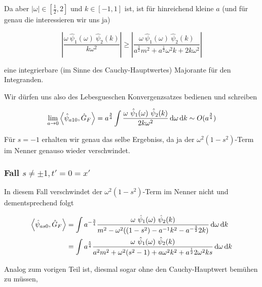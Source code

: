\documentclass{scrartcl}
\begin{document}
Da aber $|\omega| \in [\frac{1}{2},2]$ und $k \in [-1,1]$ ist, ist für hinreichend
kleine $a$ (und für genau die interessieren wir uns ja)

\begin{equation*}
    \left|
        \frac{\omega ~\hat \psi_1(\omega) ~\hat \psi_2(k)}{k \omega^2}
    \right|
    \geq
    \left|
        \frac{\omega ~\hat \psi_1(\omega) ~\hat \psi_2(k)}
        {a^\frac{3}{2}m^2+a^\frac{1}{2}\omega^2 k+2k \omega^2}
    \right|
\end{equation*}

eine integrierbare (im Sinne des Cauchy-Hauptwertes) Majorante für den Integranden.


Wir dürfen uns also des Lebesgueschen Konvergenzsatzes bedienen und schreiben

\begin{equation}
    \lim_{a \rightarrow 0} \left< \hat\psi_{a10}, \hat G_F \right> =
    a^\frac{3}{4} \int \frac{
    \omega ~\hat \psi_1(\omega) ~\hat \psi_2(k)
    }
    {
    2k \omega^2
    }
    \mathop{}\!\mathrm{d} \omega \mathop{}\!\mathrm{d} k
    \sim O(a^\frac{3}{4})
\end{equation}

Für $s = -1$ erhalten wir genau das selbe Ergebniss, da ja der $\omega^2 (1-s^2)$-Term
im Nenner genauso wieder verschwindet.

\subsubsection*{Fall $s \neq \pm 1, t' = 0 = x'$}
In diesem Fall verschwindet der $\omega^2 (1-s^2)$-Term im Nenner nicht und
dementsprechend folgt

\begin{align*}
    \left< \hat\psi_{as0}, \hat G_F \right>
    &=
    \int a^{-\frac{3}{4}} \frac{
        \omega ~\hat \psi_1(\omega) ~\hat \psi_2(k)
    }
    {
        m^2-\omega^2 ((1-s^2) - a^{-1}k^2 - a^{-\frac{3}{2}}2 k )
    }
    \mathop{}\!\mathrm{d} \omega \mathop{}\!\mathrm{d} k \\
    &=
    \int a^{\frac{5}{4}} \frac{
        \omega ~\hat \psi_1(\omega) ~\hat \psi_2(k)
    }
    {
        a^2 m^2+\omega^2 (s^2-1) + a \omega^2 k^2 + a^\frac{1}{2}2 \omega^2 k s
    }
    \mathop{}\!\mathrm{d} \omega \mathop{}\!\mathrm{d} k
\end{align*}

Analog zum vorigen Teil ist, diesmal sogar ohne den Cauchy-Hauptwert bemühen zu
müssen,
\end{document}
